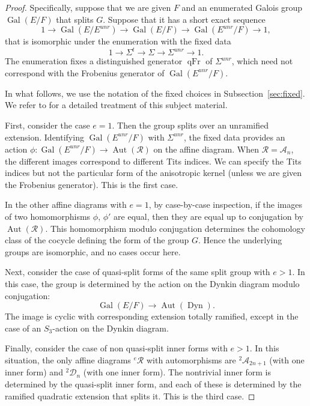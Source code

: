 \documentclass[12pt]{amsart}
\newcommand{\op}[1]{\operatorname{#1}}
\newcommand{\cal}[1]{\mathcal{#1}}
\def\R{\cal{R}}
\theoremstyle{plain}
\theoremstyle{definition}
\begin{document}
\begin{proof}
  Specifically, suppose that we are given $F$ and an enumerated Galois
  group $\op{Gal}(E/F)$ that splits $G$.  Suppose that it has a short
  exact sequence
\[
1 \to\op{Gal}(E/E^{unr})\to \op{Gal}(E/F) \to \op{Gal}(E^{unr}/F)\to 1,
\]
that is isomorphic under the enumeration with the fixed data
\[
1 \to\Sigma^t\to\Sigma\to\Sigma^{unr}\to 1.
\]
The enumeration fixes a distinguished generator $\op{qFr}$ of
$\Sigma^{unr}$, which need not correspond with the Frobenius generator
of $\op{Gal}(E^{unr}/F)$.

In what follows, we use the notation of the fixed choices in
Subsection~\ref{sec:fixed}.  We refer to \cite{Gross} for a detailed treatment
of this subject material.

First, consider the case $e=1$.  Then the group splits over an
unramified extension.  Identifying $\op{Gal}(E^{unr}/F)$ with
$\Sigma^{unr}$, the fixed data provides an action
$\phi:\op{Gal}(E^{unr}/F)\to \op{Aut}(\R)$ on the affine diagram.  When
$\R = \cal{A}_n$, the different images correspond to different Tits
indices.  We can specify the Tits indices but not the particular form
of the anisotropic kernel (unless we are given the Frobenius generator).
This is the first case.

In the other affine diagrams with $e=1$, by case-by-case inspection,
if the images of two homomorphisms $\phi$, $\phi'$ are equal, then
they are equal up to conjugation by $\op{Aut}(\R)$.  This homomorphism
modulo conjugation determines the cohomology class of the cocycle
defining the form of the group $G$.  Hence the underlying groups are
isomorphic, and no cases occur here.

Next, consider the case of quasi-split forms of the same split group
with $e>1$.  In this case, the group is determined by the action on
the Dynkin diagram modulo conjugation:
\[
\op{Gal}(E/F)\to \op{Aut}(\op{Dyn}).
\]
The image is cyclic with corresponding extension totally
ramified, except in the case of an $S_3$-action on the Dynkin diagram.

Finally, consider the case of non quasi-split inner forms with $e>1$.  In
this situation, the only affine diagrams ${}^e\R$ with automorphisms
are ${}^2\cal{A}_{2n+1}$ (with one inner form) and ${}^2\cal{D}_n$
(with one inner form).  The nontrivial inner form is determined by the
quasi-split inner form, and each of these is determined by the
ramified quadratic extension that splits it. This is the third case.
\end{proof}
\end{document}
